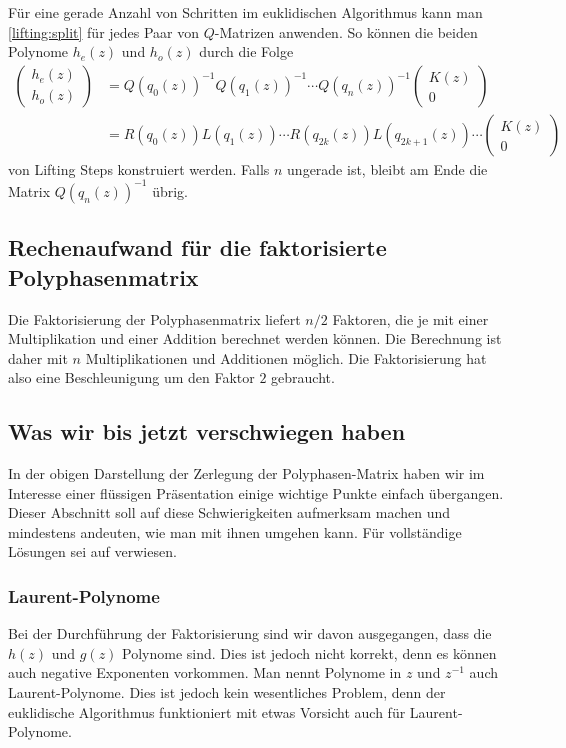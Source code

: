 Für eine gerade Anzahl von Schritten im euklidischen Algorithmus 
kann man \eqref{lifting:split} für jedes Paar von $Q$-Matrizen anwenden.
So können die beiden Polynome $h_e(z)$ und $h_o(z)$ durch die Folge
\begin{align*}
\begin{pmatrix} h_e(z)\\h_o(z)\end{pmatrix}
&=
Q(q_0(z))^{-1}
Q(q_1(z))^{-1}
\cdots
Q(q_n(z))^{-1}
\begin{pmatrix}K(z)\\ 0 \end{pmatrix}
\\
&=
R(q_0(z)) L(q_1(z)) \cdots R(q_{2k}(z)) L(q_{2k+1}(z)) \cdots 
\begin{pmatrix}K(z)\\ 0 \end{pmatrix}
\end{align*}
von Lifting Steps konstruiert werden.
Falls $n$ ungerade ist, bleibt am Ende die Matrix $Q(q_n(z))^{-1}$
übrig.

\subsection{Rechenaufwand für die faktorisierte Polyphasenmatrix}
Die Faktorisierung der Polyphasenmatrix liefert $n/2$ Faktoren,
die je mit einer Multiplikation und einer Addition berechnet werden
können.
Die Berechnung ist daher mit $n$ Multiplikationen und Additionen
möglich.
Die Faktorisierung hat also eine Beschleunigung um den Faktor $2$ 
gebraucht.

\subsection{Was wir bis jetzt verschwiegen haben}
In der obigen Darstellung der Zerlegung der Polyphasen-Matrix 
haben wir im Interesse einer flüssigen Präsentation einige
wichtige Punkte einfach übergangen.
Dieser Abschnitt soll auf diese Schwierigkeiten aufmerksam machen
und mindestens andeuten, wie man mit ihnen umgehen kann.
Für vollständige Lösungen sei auf \cite{fpga:Daubechies1998} verwiesen.

\subsubsection{Laurent-Polynome}
Bei der Durchführung der Faktorisierung sind wir davon ausgegangen,
dass die $h(z)$ und $g(z)$ Polynome sind.
Dies ist jedoch nicht korrekt, denn es können auch negative
Exponenten vorkommen.
Man nennt Polynome in $z$ und $z^{-1}$ auch Laurent-Polynome.
Dies ist jedoch kein wesentliches Problem, denn der euklidische
Algorithmus funktioniert mit etwas Vorsicht auch für Laurent-Polynome.

